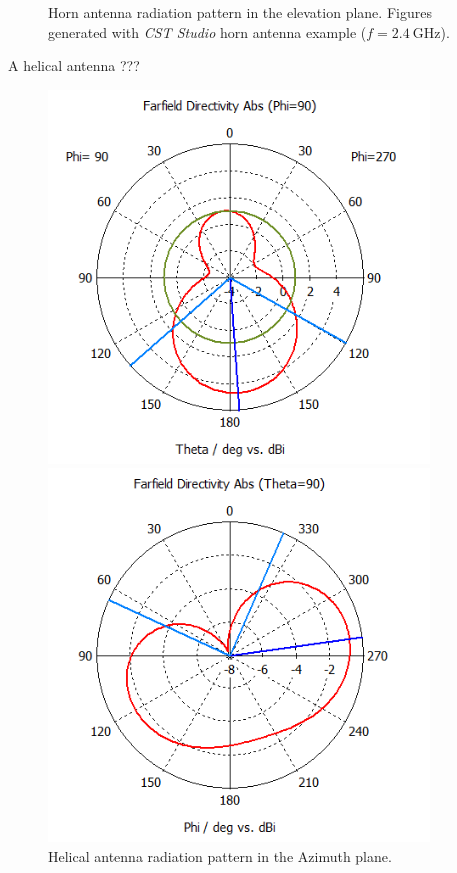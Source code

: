 \begin{figure}[H]
\begin{minipage}{0.45\textwidth}
        \caption{Horn antenna radiation pattern in the elevation plane. Figures generated with \textit{CST Studio} horn antenna example ($f=\SI{2.4}{\giga\hertz}$).}
        \label{fig:horn_2}
    \end{minipage}
\end{figure}

A helical antenna ???%
\begin{figure}[H]
    \begin{minipage}{0.45\textwidth}
        \centering
        \includegraphics[width=0.9\textwidth]{figures/farfield (f=2.4) helical.png} %
        \caption{Helical antenna radiation pattern in the Azimuth plane.} 
        \label{fig:helical_1}
    \end{minipage}\hfill
    \begin{minipage}{0.45\textwidth}
        \centering
        \includegraphics[width=0.9\textwidth]{figures/farfield (f=2.4) helical_1.png} %

\end{minipage}
\end{figure}
